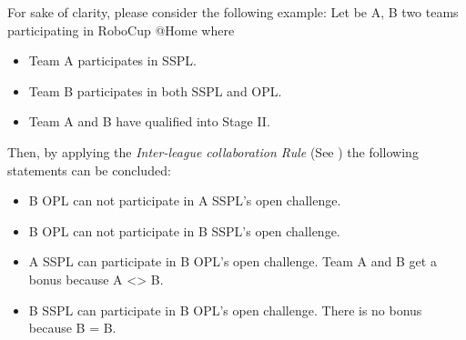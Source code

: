 For sake of clarity, please consider the following example: Let be A, B two teams participating in RoboCup @Home where
\begin{itemize}
    \item Team A participates in SSPL.
    \item Team B participates in both SSPL and OPL.
    \item Team A and B have qualified into Stage II.
\end{itemize}
Then, by applying the \textit{Inter-league collaboration Rule} (See ) the following statements can be concluded:
\begin{itemize}
  \item B OPL can not participate in A SSPL's open challenge.
  \item B OPL can not participate in B SSPL's open challenge.
  \item A SSPL can participate in B OPL's open challenge. Team A and B get a bonus because A <> B.
  \item B SSPL can participate in B OPL's open challenge. There is no bonus because B = B.
\end{itemize}




